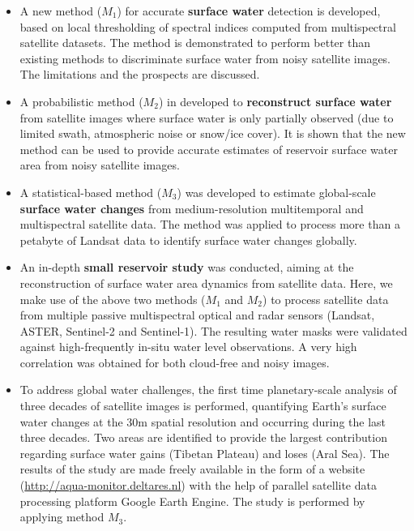 \begin{itemize}
	\item A new method ($M_1$) for accurate \textbf{surface water} detection is developed, based on local thresholding of spectral indices computed from multispectral satellite datasets. The method is demonstrated to perform better than existing methods to discriminate surface water from noisy satellite images. The limitations and the prospects are discussed.
	
	\item A probabilistic method ($M_2$) in developed to \textbf{reconstruct surface water} from satellite images where surface water is only partially observed (due to limited swath, atmospheric noise or snow/ice cover). It is shown that the new method can be used to provide accurate estimates of reservoir surface water area from noisy satellite images.
	
	\item A statistical-based method ($M_3$) was developed to estimate global-scale \textbf{surface water changes} from medium-resolution multitemporal and multispectral satellite data. The method was applied to process more than a petabyte of Landsat data to identify surface water changes globally.
	
	\item An in-depth \textbf{small reservoir study} was conducted, aiming at the reconstruction of surface water area dynamics from satellite data. Here, we make use of the above two methods ($M_1$ and $M_2$)  to process satellite data from multiple passive multispectral optical and radar sensors (Landsat, ASTER, Sentinel-2 and Sentinel-1). The resulting water masks were validated against high-frequently in-situ water level observations. A very high correlation was obtained for both cloud-free and noisy images. 
	
	\item To address global water challenges, the first time planetary-scale analysis of three decades of satellite images is performed, quantifying Earth's surface water changes at the 30m spatial resolution and occurring during the last three decades. Two areas are identified to provide the largest contribution regarding surface water gains (Tibetan Plateau) and loses (Aral Sea). The results of the study are made freely available in the form of a website (\url{http://aqua-monitor.deltares.nl}) with the help of parallel satellite data processing platform Google Earth Engine. The study is performed by applying method $M_3$.
	

\end{itemize}
